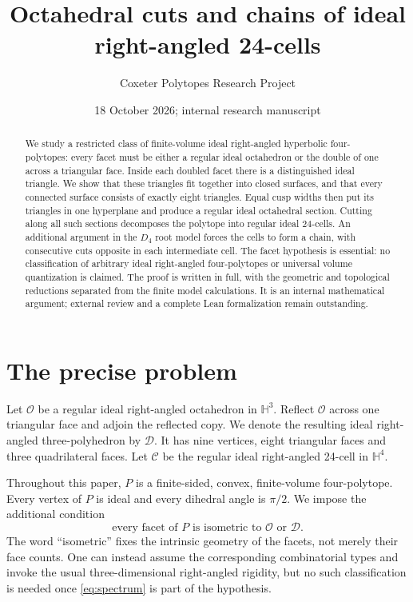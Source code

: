 \documentclass[11pt]{article}
\title{Octahedral cuts and chains of ideal right-angled 24-cells}
\author{Coxeter Polytopes Research Project}
\date{18 October 2026; internal research manuscript}
\theoremstyle{remark}
\newcommand{\HH}{\mathbb H}
\newcommand{\OCT}{\mathcal O}
\newcommand{\DBL}{\mathcal D}
\newcommand{\CELL}{\mathcal C}
\begin{document}
\maketitle
\begin{abstract}
We study a restricted class of finite-volume ideal right-angled
hyperbolic four-polytopes: every facet must be either a regular ideal
octahedron or the double of one across a triangular face. Inside each
doubled facet there is a distinguished ideal triangle. We show that
these triangles fit together into closed surfaces, and that every
connected surface consists of exactly eight triangles. Equal cusp
widths then put its triangles in one hyperplane and produce a regular
ideal octahedral section. Cutting along all such sections decomposes
the polytope into regular ideal 24-cells. An additional argument in
the $D_4$ root model forces the cells to form a chain, with consecutive
cuts opposite in each intermediate cell. The facet hypothesis is
essential: no classification of arbitrary ideal right-angled
four-polytopes or universal volume quantization is claimed. The proof
is written in full, with the geometric and topological reductions
separated from the finite model calculations. It is an internal
mathematical argument; external review and a complete Lean
formalization remain outstanding.
\end{abstract}

\section{The precise problem}

Let $\OCT$ be a regular ideal right-angled octahedron in $\HH^3$.
Reflect $\OCT$ across one triangular face and adjoin the reflected
copy. We denote the resulting ideal right-angled three-polyhedron
by $\DBL$. It has nine vertices, eight triangular faces and three
quadrilateral faces. Let $\CELL$ be the regular ideal right-angled
24-cell in $\HH^4$.

Throughout this paper, $P$ is a finite-sided, convex, finite-volume
four-polytope. Every vertex of $P$ is ideal and every dihedral angle
is $\pi/2$. We impose the additional condition
\begin{equation}\label{eq:spectrum}
 \text{every facet of $P$ is isometric to $\OCT$ or $\DBL$.}
\end{equation}
The word ``isometric'' fixes the intrinsic geometry of the facets,
not merely their face counts. One can instead assume the corresponding
combinatorial types and invoke the usual three-dimensional
right-angled rigidity, but no such classification is needed once
\eqref{eq:spectrum} is part of the hypothesis.
\end{document}
